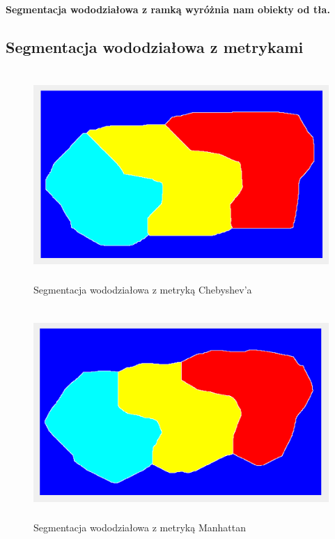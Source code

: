\documentclass[a4paper,12pt]{article}
\begin{document}
\begin{justify}
\paragraph{Segmentacja wododziałowa z ramką wyróżnia nam obiekty od tła.}

\subsection{Segmentacja wododziałowa z metrykami}

\begin{figure}[h]
\centering
\includegraphics[width=12cm, height=8cm]{13_1}
\caption{Segmentacja wododziałowa z metryką Chebyshev'a}
\end{figure}

\newpage

\begin{figure}[h]
\centering
\includegraphics[width=12cm, height=8cm]{13_2}
\caption{Segmentacja wododziałowa z metryką Manhattan}
\end{figure}


\end{justify}
\end{document}
